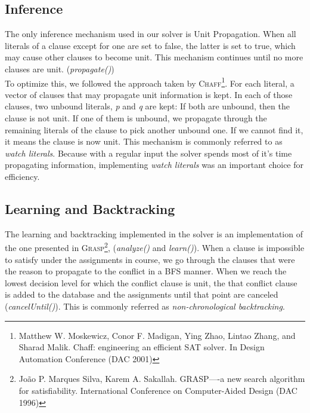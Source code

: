     \subsection{Inference}
    The only inference mechanism used in our solver is Unit Propagation. When all literals of a clause except for one are set to false, the latter is set to true, which may cause other clauses to become unit. This mechanism continues until no more clauses are unit. (\textit{propagate()}) \\
    To optimize this, we followed the approach taken by \textsc{Chaff}\footnote{Matthew W. Moskewicz, Conor F. Madigan, Ying Zhao, Lintao Zhang, and Sharad Malik. Chaff: engineering an efficient SAT solver. In Design Automation Conference (DAC 2001)}. For each literal, a vector of clauses that may propagate unit information is kept. In each of those clauses, two unbound literals, \textit{p} and \textit{q} are kept: If both are unbound, then the clause is not unit. If one of them is unbound, we propagate through the remaining literals of the clause to pick another unbound one. If we cannot find it, it means the clause is now unit. This mechanism is commonly referred to as \textit{watch literals}. Because with a regular input the solver spends most of it's time propagating information, implementing \textit{watch literals} was an important choice for efficiency. \\
    
    \subsection{Learning and Backtracking}
    The learning and backtracking implemented in the solver is an implementation of the one presented in \textsc{Grasp}\footnote{João P. Marques Silva, Karem A. Sakallah. GRASP—-a new search algorithm for satisfiability. International Conference on Computer-Aided Design (DAC 1996)}, (\textit{analyze()} and \textit{learn()}). When a clause is impossible to satisfy under the assignments in course, we go through the clauses that were the reason to propagate to the conflict in a BFS manner. When we reach the lowest decision level for which the conflict clause is unit, the that conflict clause is added to the database and the assignments until that point are canceled (\textit{cancelUntil()}). This is commonly referred as \textit{non-chronological backtracking}. \\
    
